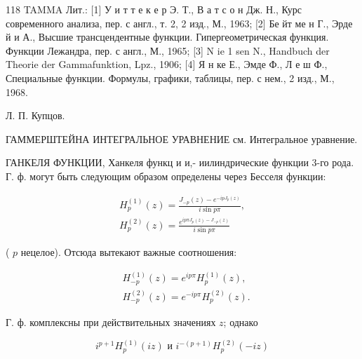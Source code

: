 \documentclass[10pt]{article}
\begin{document}
118 TAMMA Лит.: [1] У и т т е к е р Э. Т., В а т с о н Дж. Н., Курс современного анализа, пер. с англ., т. 2, 2 изд., М., 1963; [2] Бе йт ме н Г., Эрде й и А., Высшие трансцендентные функции. Гипергеометрическая функция. Функции Лежандра, пер. с англ., М., 1965; [3] N ie 1 sen N., Handbuch der Theorie der Gammafunktion, Lpz., 1906; [4] Я н ке Е., Эмде Ф., Л е ш Ф., Специальные функции. Формулы, графики, таблицы, пер. с нем., 2 изд., М., 1968.



Л. П. Купцов.



ГАММЕРШТЕЙНА ИНТЕГРАЛЬНОЕ УРАВНЕНИЕ см. Интегральное уравнение.



ГАНКЕЛЯ ФУНКЦИИ, Ханкеля функц и и,- иилиндрические функции 3-го рода. Г. ф. могут быть следующим образом определены через Бесселя функции:



\[

\begin{gathered}

H_{p}^{(1)}(z)=\frac{J_{-p}(z)-e^{-i p J_{p}(z)}}{i \sin p \pi}, \\

H_{p}^{(2)}(z)=\frac{e^{i p \pi J_{p}(z)-J_{-p}(z)}}{i \sin p \pi}

\end{gathered}

\]



( $p$ нецелое). Отсюда вытекают важные соотношения:



\[

\begin{aligned}

& H_{-p}^{(1)}(z)=e^{i p \pi} H_{p}^{(1)}(z), \\

& H_{-p}^{(2)}(z)=e^{-i p \pi} H_{p}^{(2)}(z) .

\end{aligned}

\]



Г. ф. комплексны при действительных значениях $z$; однако



\[

i^{p+1} H_{p}^{(1)}(i z) \text { и } i^{-(p+1)} H_{p}^{(2)}(-i z)

\]
\end{document}

